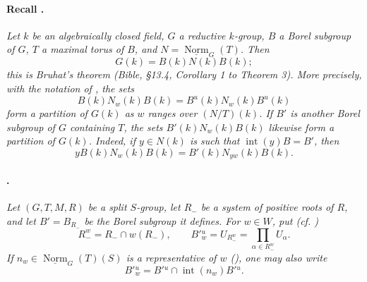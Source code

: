 \paragraph{Recall .}
\textit{Let \(k\) be an algebraically closed field, \(G\) a
reductive \(k\)-group, \(B\) a Borel subgroup of \(G\), \(T\) a
maximal torus of \(B\), and
\(N=\underline{\operatorname{Norm}}_G(T)\). Then}
\[
  G(k)=B(k)N(k)B(k);
\]
\textit{this is Bruhat's theorem \textup{(\emph{Bible}, \S13.4,
Corollary 1 to Theorem 3)}. More precisely, with the notation of
, the sets}
\[
  B(k)N_w(k)B(k)=B^u(k)N_w(k)B^u(k)
\]
\textit{form a partition of \(G(k)\) as \(w\) ranges over
\((N/T)(k)\). If \(B'\) is another Borel subgroup of \(G\)
containing \(T\), the sets \(B'(k)N_w(k)B(k)\) likewise form a
partition of \(G(k)\). Indeed, if \(y\in N(k)\) is such that
\(\operatorname{int}(y)B=B'\), then}
\[
  yB(k)N_w(k)B(k)=B'(k)N_{yw}(k)B(k).
\]

\paragraph{.}
\textit{Let \((G,T,M,R)\) be a split \(S\)-group, let \(R_-\) be a
system of positive roots of \(R\), and let \(B'=B_{R_-}\) be the
Borel subgroup it defines. For \(w\in W\), put
\textup{(cf. )}}
\[
  R_-^w=R_-\cap w(R_-),
  \qquad
  B'{}^u_w=U_{R_-^w}
  =\prod_{\alpha\in R_-^w}U_\alpha.
\]
\textit{If
\(n_w\in\underline{\operatorname{Norm}}_G(T)(S)\) is a
representative of \(w\) \textup{()}, one may also write}
\[
  B'{}^u_w=B'{}^u\cap\operatorname{int}(n_w)B'{}^u.
\]

